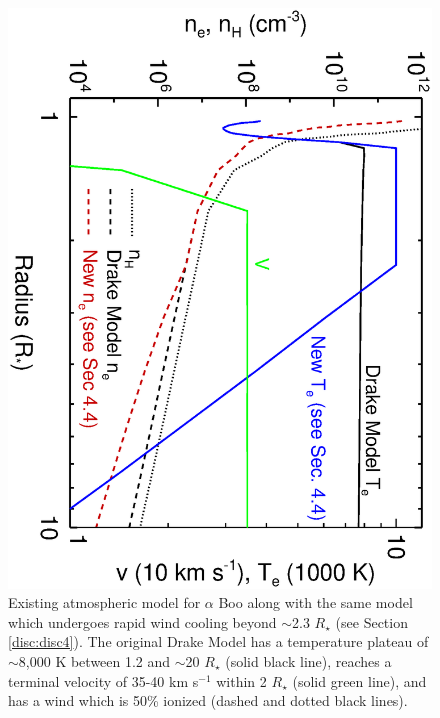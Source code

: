 \documentclass[iop]{emulateapj}
\begin{document}
\begin{figure}
\includegraphics[trim = 0mm 0mm 0mm 0mm, clip,scale=0.36,angle=90]{fig2.ps}
\caption{Existing atmospheric model for $\alpha$ Boo \cite[`model A']{1985pssl.proc..351D} along with the same model which undergoes rapid wind cooling beyond $\sim$2.3 $R_{\star}$ (see Section \ref{disc:disc4}). The original Drake Model has a temperature plateau of $\sim$8,000 K between 1.2 and $\sim$20 $R_{\star}$ (solid black line), reaches a terminal velocity of 35-40 km s$^{-1}$ within 2 $R_{\star}$ (solid green line), and has a wind which is 50\% ionized (dashed and dotted black lines).}
\label{fig:fig0}
\end{figure}
\end{document}
